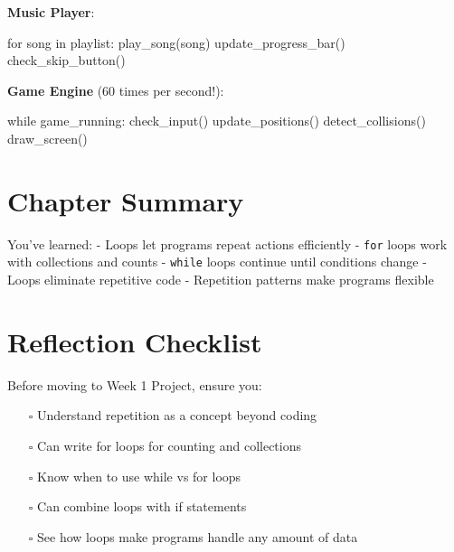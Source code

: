 \documentclass[
  letterpaper,
  DIV=11,
  numbers=noendperiod,
  oneside]{scrreprt}
\newenvironment{Shaded}{}{}
\newcommand{\ControlFlowTok}[1]{\textcolor[rgb]{0.84,0.23,0.29}{#1}}
\newcommand{\KeywordTok}[1]{\textcolor[rgb]{0.84,0.23,0.29}{#1}}
\newcommand{\NormalTok}[1]{\textcolor[rgb]{0.14,0.16,0.18}{#1}}
\providecommand{\tightlist}{%
  \setlength{\itemsep}{0pt}\setlength{\parskip}{0pt}}\usepackage{longtable,booktabs,array}
\begin{document}
\textbf{Music Player}:

\begin{Shaded}
\begin{Highlighting}[]
\ControlFlowTok{for}\NormalTok{ song }\KeywordTok{in}\NormalTok{ playlist:}
\NormalTok{    play\_song(song)}
\NormalTok{    update\_progress\_bar()}
\NormalTok{    check\_skip\_button()}
\end{Highlighting}
\end{Shaded}

\textbf{Game Engine} (60 times per second!):

\begin{Shaded}
\begin{Highlighting}[]
\ControlFlowTok{while}\NormalTok{ game\_running:}
\NormalTok{    check\_input()}
\NormalTok{    update\_positions()}
\NormalTok{    detect\_collisions()}
\NormalTok{    draw\_screen()}
\end{Highlighting}
\end{Shaded}

\section{Chapter Summary}\label{chapter-summary-5}

You've learned: - Loops let programs repeat actions efficiently -
\texttt{for} loops work with collections and counts - \texttt{while}
loops continue until conditions change - Loops eliminate repetitive code
- Repetition patterns make programs flexible

\section{Reflection Checklist}\label{reflection-checklist-4}

Before moving to Week 1 Project, ensure you:

\begin{itemize}
\tightlist
\item[$\square$]
  Understand repetition as a concept beyond coding
\item[$\square$]
  Can write for loops for counting and collections
\item[$\square$]
  Know when to use while vs for loops
\item[$\square$]
  Can combine loops with if statements
\item[$\square$]
  See how loops make programs handle any amount of data
\end{itemize}
\end{document}
